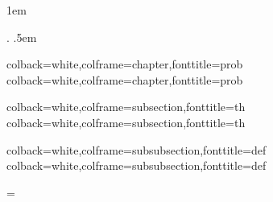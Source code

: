   {\topsep}         %
  {\topsep}         %
  {}                %
  {}                %
  {\bfseries}       %
  {\newline}        %
  {1em}             %
  {}                %

\theoremstyle{boldnewline}
\newtheorem{problem}{Problem}

{}
{}
{\upshape}
{}
{\bfseries}
{.}
{.5em}
{}
\theoremstyle{customthm}
\newtheorem{theorem}{Theorem}[chapter]
\newtheorem{definition}{Definition}[chapter]

%
{colback=white,colframe=chapter,fonttitle=\bfseries}{prob}
%
{colback=white,colframe=chapter,fonttitle=\bfseries}{prob}

%
{colback=white,colframe=subsection,fonttitle=\bfseries}{th}
%
{colback=white,colframe=subsection,fonttitle=\bfseries}{th}

%
{colback=white,colframe=subsubsection,fonttitle=\bfseries}{def}
%
{colback=white,colframe=subsubsection,fonttitle=\bfseries}{def}

\newtheorem*{researchq}{Research Question}
\newtheorem*{subsidiaryq}{Subsidiary Questions}

\usetikzlibrary{intersections, arrows.meta, calc}

\usepackage{pgf}
\usepackage{pgfplots}
\pgfplotsset{compat=1.14}
\usepackage{import}
\def\mathdefault#1{#1}
\everymath=\expandafter{\the\everymath\displaystyle}

\newif\ifshowcomments
\showcommentstrue
\ifshowcomments
    \newcommand{\mynote}[2]{\fbox{\bfseries\sffamily\scriptsize{#1}}
        {\small$\blacktriangleright$\textsf{\emph{#2}}$\blacktriangleleft$}}
    \newcommand{\citehere}[0]{\textcolor{red}{\fbox{\bfseries\sffamily\scriptsize{CITATION}}}}
\else
    \newcommand{\mynote}[2]{}
    \newcommand{\citehere}[0]{}
\fi
\newcommand{\todo}[1]{\textcolor{blue}{\mynote{To do}{#1}}}

\usepackage{subfiles}

\newcommand{\onlyinsubfile}[1]{#1}
\newcommand{\notinsubfile}[1]{}

\usepackage[backend=biber,style=numeric,sortcites,sorting=nty,backref,natbib,hyperref]{biblatex}


